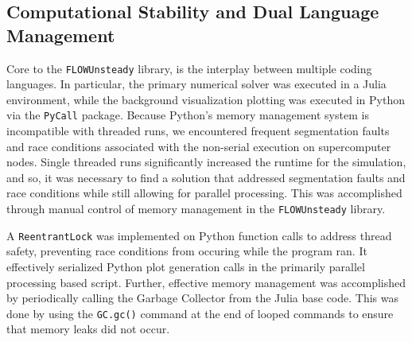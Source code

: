 \documentclass{report}
\begin{document}
\begin{appendices}
\chapter{Computational Stability and Dual Language Management}\label{app:debugging}
Core to the \texttt{FLOWUnsteady} library, is the interplay between multiple coding languages. In particular, the primary numerical solver was executed in a Julia environment, while the background visualization plotting was executed in Python via the \texttt{PyCall} package.
Because Python's memory management system is incompatible with threaded runs, we encountered frequent segmentation faults and race conditions associated with the non-serial execution on supercomputer nodes.
Single threaded runs significantly increased the runtime for the simulation, and so, it was necessary to find a solution that addressed segmentation faults and race conditions while still allowing for parallel processing.
This was accomplished through manual control of memory management in the \texttt{FLOWUnsteady} library. 

A \texttt{ReentrantLock} was implemented on Python function calls to address thread safety, preventing race conditions from occuring while the program ran. It effectively serialized Python plot generation calls in the primarily parallel processing based script.
Further, effective memory management was accomplished by periodically calling the Garbage Collector from the Julia base code. This was done by using the \texttt{GC.gc()} command at the end of looped commands to ensure that memory leaks did not occur.
\end{appendices}
\end{document}
